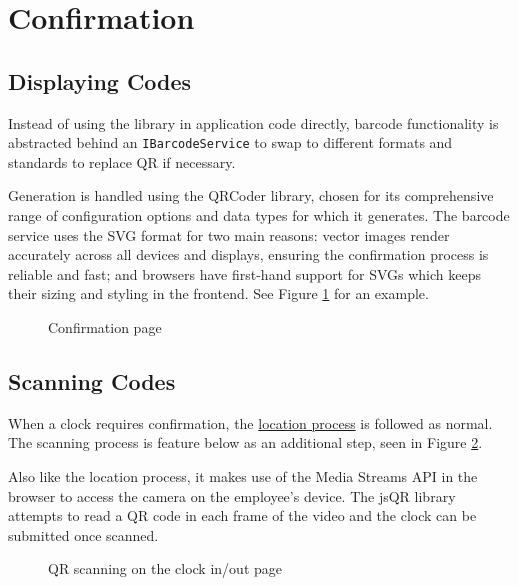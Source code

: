 \section{Confirmation}

\subsection{Displaying Codes}

Instead of using the library in application code directly,
barcode functionality is abstracted behind an
\lstinline{IBarcodeService} to swap to different formats
and standards to replace QR if necessary.

Generation is handled using the QRCoder library, chosen for
its comprehensive range of configuration options and data
types for which it generates.
The barcode service uses the SVG format for two main
reasons: vector images render accurately across all devices
and displays, ensuring the confirmation process is reliable
and fast; and browsers have first-hand support for SVGs
which keeps their sizing and styling in the frontend.
See Figure \ref{fig:confirmationCode} for an example.

\begin{figure}[h]
  \centering
  \caption{Confirmation page}
  \label{fig:confirmationCode}
\end{figure}

\subsection{Scanning Codes}

When a clock requires confirmation, the
\hyperref[s:providingLocation]{location process} is
followed as normal.
The scanning process is feature below as an additional
step, seen in Figure \ref{fig:scanCode}.

Also like the location process, it makes use of the Media
Streams API in the browser to access the camera on the
employee's device.
The jsQR library attempts to read a QR code in each frame
of the video and the clock can be submitted once scanned.

\begin{figure}[h]
  \centering
  \caption{QR scanning on the clock in/out page}
  \label{fig:scanCode}
\end{figure}